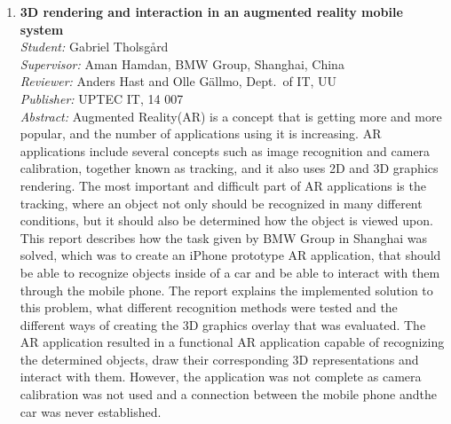 \begin{small}
\begin{enumerate}
\item\textbf{3D rendering and interaction in an augmented reality mobile system}\\
  \emph{Student:} Gabriel Tholsgård\\
  \emph{Supervisor:} Aman Hamdan, BMW Group, Shanghai, China \\
  \emph{Reviewer:} Anders Hast and Olle Gällmo, Dept.~of IT, UU\\
  \emph{Publisher:} UPTEC IT, 14 007\\
  \emph{Abstract:} Augmented Reality(AR) is a concept that is getting more and more popular, and the number of applications using it is increasing. AR applications include several concepts such as image recognition and camera calibration, together known as tracking, and it also uses 2D and 3D graphics rendering. The most important and difficult part of AR applications is the tracking, where an object not only should be recognized in many different conditions, but it should also be determined how the object is viewed upon. This report describes how the task given by BMW Group in Shanghai was solved, which was to create an iPhone prototype AR application, that should be able to recognize objects inside of a car and be able to interact with them through the mobile phone. The report explains the implemented solution to this problem, what different recognition methods were tested and the different ways of creating the 3D graphics overlay that was evaluated. The AR application resulted in a functional AR application capable of recognizing the determined objects, draw their corresponding 3D representations and interact with them. However, the application was not complete as camera calibration was not used and a connection between the mobile phone andthe car was never established.


\end{enumerate}
\end{small}
